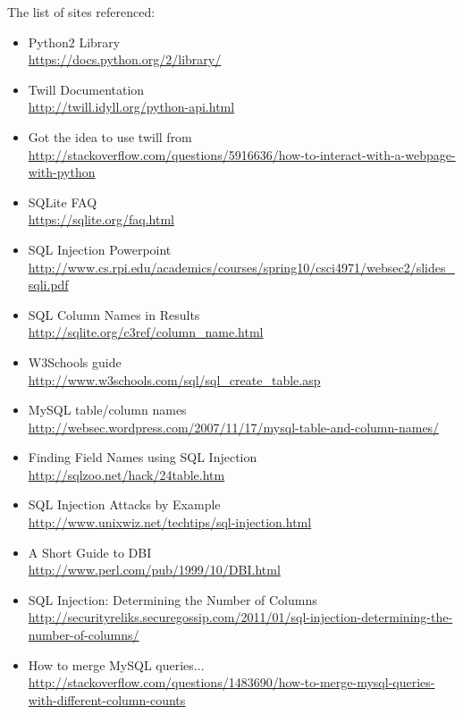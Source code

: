 \documentclass[12pt,letterpaper]{article}
\begin{document}
The list of sites referenced:
\begin{itemize}
	\item Python2 Library \\ \url{https://docs.python.org/2/library/}
	\item Twill Documentation \\ \url{http://twill.idyll.org/python-api.html}
	\item Got the idea to use twill from \\ \url{http://stackoverflow.com/questions/5916636/how-to-interact-with-a-webpage-with-python}
	\item SQLite FAQ \\ \url{https://sqlite.org/faq.html}
	\item SQL Injection Powerpoint \\ \url{http://www.cs.rpi.edu/academics/courses/spring10/csci4971/websec2/slides_sqli.pdf}
	\item SQL Column Names in Results \\ \url{http://sqlite.org/c3ref/column_name.html}
	\item W3Schools guide \\ \url{http://www.w3schools.com/sql/sql_create_table.asp}
	\item MySQL table/column names \\ \url{http://websec.wordpress.com/2007/11/17/mysql-table-and-column-names/}
	\item Finding Field Names using SQL Injection \\ \url{http://sqlzoo.net/hack/24table.htm}
	\item SQL Injection Attacks by Example \\ \url{http://www.unixwiz.net/techtips/sql-injection.html}
	\item A Short Guide to DBI \\ \url{http://www.perl.com/pub/1999/10/DBI.html}
	\item SQL Injection: Determining the Number of Columns \\ \url{http://securityreliks.securegossip.com/2011/01/sql-injection-determining-the-number-of-columns/}
	\item How to merge MySQL queries...\\ \url{http://stackoverflow.com/questions/1483690/how-to-merge-mysql-queries-with-different-column-counts}
\end{itemize}

% 

%

\end{document}
